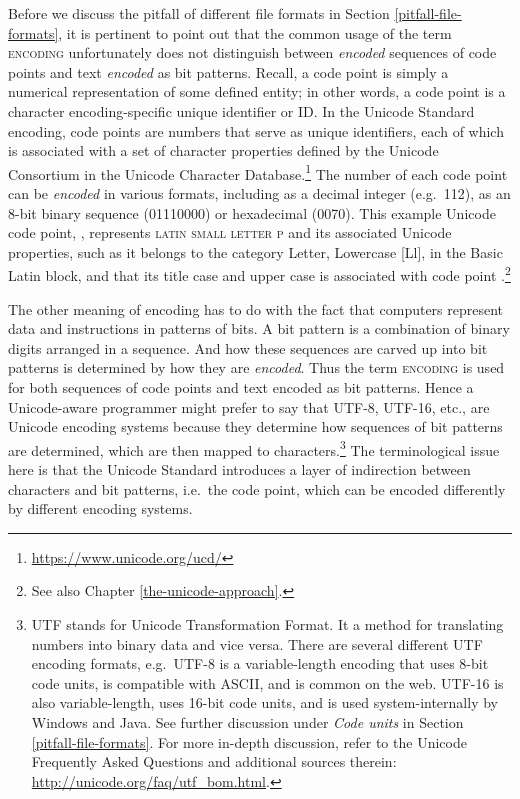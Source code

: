 Before we discuss the pitfall of different file formats in Section \ref{pitfall-file-formats}, it is pertinent to point out that the common usage of the term \textsc{encoding} unfortunately does not distinguish between \textit{encoded} sequences of code points and text \textit{encoded} as bit patterns. Recall, a code point is simply a numerical representation of some defined entity; in other words, a code point is a character encoding-specific unique identifier or ID. In the Unicode Standard encoding, code points are numbers that serve as unique identifiers, each of which is associated with a set of character properties defined by the Unicode Consortium in the Unicode Character Database.\footnote{\url{https://www.unicode.org/ucd/}} The number of each code point can be \textit{encoded} in various formats, including as a decimal integer (e.g.\ 112), as an 8-bit binary sequence (01110000) or hexadecimal (0070). This example Unicode code point, , represents \textsc{latin small letter p} and its associated Unicode properties, such as it belongs to the category Letter, Lowercase [Ll], in the Basic Latin block, and that its title case and upper case is associated with code point .\footnote{See also Chapter \ref{the-unicode-approach}.}


The other meaning of encoding has to do with the fact that computers represent data and instructions in patterns of bits. A bit pattern is a combination of binary digits arranged in a sequence. And how these sequences are carved up into bit patterns is determined by how they are \textit{encoded}. Thus the term \textsc{encoding} is used for both sequences of code points and text encoded as bit patterns. Hence a Unicode-aware programmer might prefer to say that UTF-8, UTF-16, etc., are Unicode encoding systems because they determine how sequences of bit patterns are determined, which are then mapped to characters.\footnote{UTF stands for Unicode Transformation Format. It a method for translating numbers into binary data and vice versa. There are several different UTF encoding formats, e.g.\ UTF-8 is a variable-length encoding that uses 8-bit code units, is compatible with ASCII, and is common on the web. UTF-16 is also variable-length, uses 16-bit code units, and is used system-internally by Windows and Java. See further discussion under \textit{Code units} in Section \ref{pitfall-file-formats}. For more in-depth discussion, refer to the Unicode Frequently Asked Questions and additional sources therein: \url{http://unicode.org/faq/utf_bom.html}.} The terminological issue here is that the Unicode Standard introduces a layer of indirection between characters and bit patterns, i.e.\ the code point, which can be encoded differently by different encoding systems.

